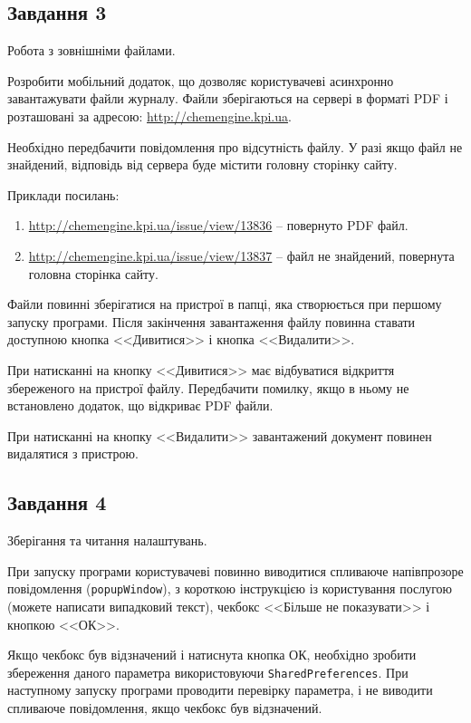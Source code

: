 \documentclass[14pt, a4paper]{extreport}
\begin{document}
	\subsection*{Завдання 3}
	
	Робота з зовнішніми файлами.
	
	Розробити мобільний додаток, що дозволяє користувачеві асинхронно завантажувати файли журналу. Файли зберігаються на сервері в форматі PDF і розташовані за адресою:
	\url{http://chemengine.kpi.ua}.
	
	Необхідно передбачити повідомлення про відсутність файлу. У разі якщо файл не знайдений, відповідь від сервера буде містити головну сторінку сайту.
	
	Приклади посилань:
	
	\begin{enumerate}
		\item \url{http://chemengine.kpi.ua/issue/view/13836} -- повернуто PDF файл.
		
		\item\url{http://chemengine.kpi.ua/issue/view/13837} -- файл не знайдений, повернута головна сторінка сайту.
	\end{enumerate}
	
	Файли повинні зберігатися на пристрої в папці, яка створюється при першому запуску програми. Після закінчення завантаження файлу повинна ставати доступною кнопка <<Дивитися>> і кнопка <<Видалити>>. 
	
	При натисканні на кнопку <<Дивитися>> має відбуватися відкриття збереженого на пристрої файлу. Передбачити помилку, якщо в ньому не встановлено додаток, що відкриває PDF файли. 
	
	При натисканні на кнопку <<Видалити>> завантажений документ повинен видалятися з пристрою.
	
	\subsection*{Завдання 4}
	
	Зберігання та читання налаштувань.
	
	При запуску програми користувачеві повинно виводитися спливаюче напівпрозоре повідомлення (\texttt{popupWindow}), з короткою інструкцією із користування послугою (можете написати випадковий текст), чекбокс <<Більше не показувати>> і кнопкою <<ОК>>.
	
	Якщо чекбокс був відзначений і натиснута кнопка ОК, необхідно зробити збереження даного параметра використовуючи \texttt{SharedPreferences}. При наступному запуску програми проводити перевірку параметра, і не виводити спливаюче повідомлення, якщо чекбокс був відзначений.
	
\end{document}
